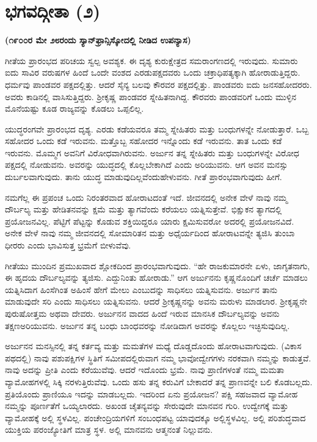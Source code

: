 
\chapter{ಭಗವದ್ಗೀತಾ (೨)}

\centerline{\textbf{(೧೯೦೦ರ ಮೇ ೨೮ರಂದು ಸ್ಯಾನ್​ಫ್ರಾನ್ಸಿಸ್ಕೋದಲ್ಲಿ ನೀಡಿದ ಉಪನ್ಯಾಸ)}}

ಗೀತೆಯ ಪ್ರಾರಂಭದ ಪರಿಚಯ ಸ್ವಲ್ಪ ಅವಶ್ಯಕ. ಈ ದೃಶ್ಯ ಕುರುಕ್ಷೇತ್ರದ ಸಮರಾಂಗಣದಲ್ಲಿ ಇರುವುದು. ಸುಮಾರು ಐದು ಸಾವಿರ ವರುಷಗಳ ಹಿಂದೆ ಒಂದೇ ವಂಶದ ಎರಡು\break ಪಕ್ಷದವರು ಒಂದು ಚಕ್ರಾಧಿಪತ್ಯಕ್ಕಾಗಿ ಹೋರಾಡುತ್ತಿದ್ದರು. ಧರ್ಮವು ಪಾಂಡ\-ವರ ಪಕ್ಷದಲ್ಲಿತ್ತು. ಆದರೆ ಸೈನ್ಯ ಬಲವು ಕೌರವರ ಪಕ್ಷದಲ್ಲಿತ್ತು. ಪಾಂಡವರು ಐದು ಜನ\break ಸಹೋದರರು. ಅವರು ಕಾಡಿನಲ್ಲಿ ವಾಸಿಸುತ್ತಿದ್ದರು. ಶ‍್ರೀಕೃಷ್ಣ ಪಾಂಡವರ ಸ್ನೇಹಿತನಾಗಿದ್ದ. ಕೌರವರು ಪಾಂಡವರಿಗೆ ಒಂದು ಮುಳ್ಳಿನ ಮೊನೆಯಷ್ಟು ಕೂಡ ರಾಜ್ಯವನ್ನು ಕೊಡಲು ಒಪ್ಪಲಿಲ್ಲ.

ಯುದ್ಧರಂಗವೇ ಪ್ರಾರಂಭದ ದೃಶ್ಯ. ಎರಡು ಕಡೆಯವರೂ ತಮ್ಮ ಸ್ನೇಹಿತರು ಮತ್ತು ಬಂಧುಗಳನ್ನೇ ನೋಡುತ್ತಾರೆ. ಒಬ್ಬ ಸಹೋದರ ಒಂದು ಕಡೆ ಇರುವನು. ಮತ್ತೊಬ್ಬ ಸಹೋದರ ಇನ್ನೊಂದು ಕಡೆ ಇರುವನು. ತಾತ ಒಂದು ಕಡೆ ಇರುವನು. ಮೊಮ್ಮಗ ಅವನಿಗೆ ವಿರೋಧವಾಗಿರುವನು. ಅರ್ಜುನ ತನ್ನ ಸ್ನೇಹಿತರು ಮತ್ತು ಬಂಧುಗಳನ್ನೇ ವಿರೋಧ ಪಕ್ಷದಲ್ಲಿ ನೋಡುವನು. ಅವರನ್ನು ಯುದ್ಧದಲ್ಲಿ ಕೊಲ್ಲಬೇಕಾಗಿದೆ ಎಂದು ಅರಿಯುವನು. ಆಗ ಅವನ ಮನಸ್ಸು ದುರ್ಬಲವಾಗುವುದು. ತಾನು ಯುದ್ಧ ಮಾಡುವುದಿಲ್ಲವೆಂದು\break ಹೇಳುವನು. ಗೀತೆ ಪ್ರಾರಂಭವಾಗುವುದು ಹೀಗೆ.

ನಮಗೆಲ್ಲ ಈ ಪ್ರಪಂಚ ಒಂದು ನಿರಂತರವಾದ ಹೋರಾಟದಂತೆ ಇದೆ. ಜೀವನದಲ್ಲಿ ಅನೇಕ ವೇಳೆ ನಾವು ನಮ್ಮ ದೌರ್ಬಲ್ಯ ಮತ್ತು ಹೇಡಿತನವನ್ನು ಕ್ಷಮೆ ಮತ್ತು ತ್ಯಾಗವೆಂದು ಕರೆಯಲು ಯತ್ನಿಸುತ್ತೇವೆ. ಭಿಕ್ಷುಕನ ತ್ಯಾಗದಲ್ಲಿ ಪ್ರಯೋಜನವಿಲ್ಲ. ಪೆಟ್ಟಿಗೆ ಪೆಟ್ಟನ್ನು ಕೊಡುವ ಶಕ್ತಿಯಿದ್ದರೂ ಯಾರು ಕ್ಷಮಿಸುವರೋ ಅದರಲ್ಲಿ ಪ್ರಯೋಜನವಿದೆ. ಅನೇಕ ವೇಳೆ ನಾವು ನಮ್ಮ ಜೀವನದಲ್ಲಿ ಸೋಮಾರಿತನ ಮತ್ತು ಅಧೈರ್ಯದಿಂದ ಹೋರಾಟವನ್ನೇ ತ್ಯಜಿಸಿ ತುಂಬಾ ಧೀರರು ಎಂದು ಭಾವಿಸುತ್ತ ಭ್ರಮೆಗೆ ಬೀಳುವೆವು.

ಗೀತೆಯು ಮುಂದಿನ ಪ್ರಮುಖವಾದ ಶ್ಲೋಕದಿಂದ ಪ್ರಾರಂಭವಾಗುವುದು. “ಹೇ ರಾಜಕುಮಾರನೇ ಏಳು, ಜಾಗೃತನಾಗು, ಈ ಹೃದಯ ದೌರ್ಬಲ್ಯವನ್ನು ತ್ಯಜಿಸು. ಎದ್ದುನಿಂತು ಹೋರಾಡು.” ಆಗ ಅರ್ಜುನನು ಕೃಷ್ಣನೊಂದಿಗೆ ಚರ್ಚೆ ಮಾಡಲು ಯತ್ನಿಸಿದಾಗ ಹಿಂಸೆಗಿಂತ ಅಹಿಂಸೆ ಹೇಗೆ ಮೇಲು ಎಂಬುದನ್ನು ಸಾಧಿಸಲು ಯತ್ನಿಸುವನು. ಅರ್ಜುನ ತಾನು ಮಾಡುವುದೇ ಸರಿ ಎಂದು ಸಾಧಿಸಲು ಯತ್ನಿಸುವನು. ಆದರೆ ಶ‍್ರೀಕೃಷ್ಣನನ್ನು ಅವನು ಮರುಳು ಮಾಡಲಾರ. ಶ‍್ರೀಕೃಷ್ಣನೇ ಪುರುಷೋತ್ತಮ ಅಥವಾ ದೇವರು. ಅರ್ಜುನನ ವಾದದ ಹಿಂದೆ ಇರುವ ಮಾನಸಿಕ ದೌರ್ಬಲ್ಯವನ್ನು ಅವನು ತಕ್ಷಣ\break ಅರಿಯುವನು. ಅರ್ಜುನ ತನ್ನ ಬಂಧು ಬಾಂಧವರನ್ನು ನೋಡಿದಾಗ ಅವರನ್ನು ಕೊಲ್ಲಲು ಇಚ್ಛಿಸುವುದಿಲ್ಲ.

ಅರ್ಜುನನ ಮನಸ್ಸಿನಲ್ಲಿ ತನ್ನ ಕರ್ತವ್ಯ ಮತ್ತು ಮಮತೆಗಳ ಮಧ್ಯೆ ದೊಡ್ಡದೊಂದು ಹೋರಾಟವಾಗುವುದು. (ವಿಕಾಸ ಪಥದಲ್ಲಿ) ನಾವು ಪಶುಪಕ್ಷಿಗಳ ಸ್ಥಿತಿಗೆ ಸಮೀಪದಲ್ಲಿರುವಾಗ ನಮ್ಮ ಭಾವೋದ್ವೇಗಗಳು ನರಕವಾಗಿ ನಮ್ಮನ್ನು ಕಾಡುತ್ತವೆ. ನಾವು ಅದನ್ನು ಪ್ರೀತಿ ಎಂದು ಕರೆಯುವೆವು. ಆದರೆ ಇದೊಂದು ಭ್ರಮೆ. ನಾವು ಪ್ರಾಣಿಗಳಂತೆ ನಮ್ಮ ಮಮತಾ ವ್ಯಾಮೋಹಗಳಲ್ಲಿ ಸಿಕ್ಕಿ ನರಳುತ್ತಿರುವೆವು. ಒಂದು ಹಸು ತನ್ನ ಕರುವಿಗೆ ಬೇಕಾದರೆ ತನ್ನ ಪ್ರಾಣವನ್ನೇ ಬಲಿ ಕೊಡಬಲ್ಲದು. ಪ್ರತಿಯೊಂದು ಪ್ರಾಣಿಯೂ ಇದನ್ನು ಮಾಡಬಲ್ಲದು. ಇದರಿಂದ ಏನು ಪ್ರಯೋಜನ? ಪಕ್ಷಿ ಸಹಜವಾದ ವ್ಯಾಮೋಹ ನಮ್ಮನ್ನು ಪೂರ್ಣತೆಗೆ ಒಯ್ಯಲಾರದು. ಅಖಂಡ ಚೈತನ್ಯವನ್ನು ಸೇರುವುದೇ ಮಾನವನ ಗುರಿ. ಉದ್ವೇಗಕ್ಕೆ ಮತ್ತು ವ್ಯಾಮೋಹಕ್ಕೆ ಅಲ್ಲಿ ಸ್ಥಳವಿಲ್ಲ. ಪಂಚೇಂದ್ರಿಯಗಳಿಗೆ ಸಂಬಂಧಪಟ್ಟ ಯಾವುದಕ್ಕೂ ಅಲ್ಲಿ\break ಸ್ಥಳವಿಲ್ಲ. ಅಲ್ಲಿ ಪರಿಶುದ್ಧವಾದ ಯುಕ್ತಿಯ ಪರಂಜ್ಯೋತಿಗೆ ಮಾತ್ರ ಸ್ಥಳ. ಅಲ್ಲಿ ಮಾನವನು ಆತ್ಮನಂತೆ ನಿಲ್ಲುವನು.

